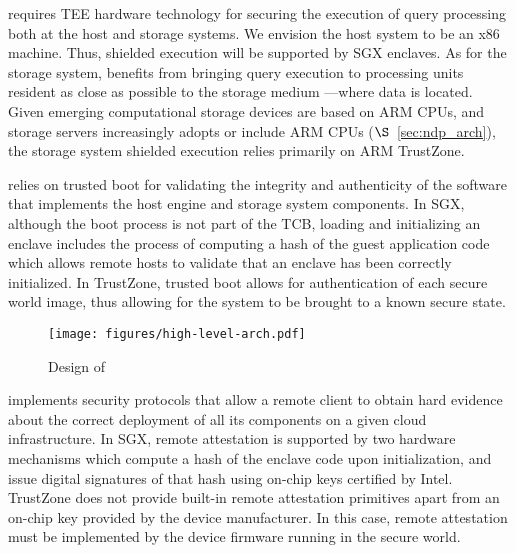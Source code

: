  \project{} requires TEE hardware technology for securing the execution of query processing both at the host and storage systems.
We envision the host system to be an x86 machine. Thus, shielded execution will be supported by SGX enclaves.
As for the storage system, \project{} benefits from bringing query execution to processing units resident as close as possible to the storage medium ---where data is located.
Given emerging computational storage devices are based on ARM CPUs, and storage servers increasingly adopts or include ARM CPUs %
($\S$~\ref{sec:ndp_arch}), the storage system shielded execution relies primarily on ARM TrustZone.

 \project{} relies on trusted boot for validating the integrity and authenticity of the software that implements the host engine and storage system components. In SGX, although the boot process is not part of the TCB, loading and initializing an enclave includes the process of computing a hash of the guest application code which allows remote hosts to validate that an enclave has been correctly initialized. In TrustZone, trusted boot allows for authentication of each secure world image, thus allowing for the system to be brought to a known secure state.

\begin{figure}[t]
	\centering
	\texttt{[image: figures/high-level-arch.pdf]}
	\caption{Design of \project{}}
	\label{fig:secndp-arch_overview} 
\end{figure}
 \project{} implements security protocols that allow a remote client to obtain hard evidence about the correct deployment of all its components on a given cloud infrastructure. In SGX, remote attestation is supported by two hardware mechanisms which compute a hash of the enclave code upon initialization, and issue digital signatures of that hash using on-chip keys certified by Intel. TrustZone does not provide built-in remote attestation primitives apart from an on-chip key provided by the device manufacturer. In this case, remote attestation must be implemented by the device firmware running in the secure world.


